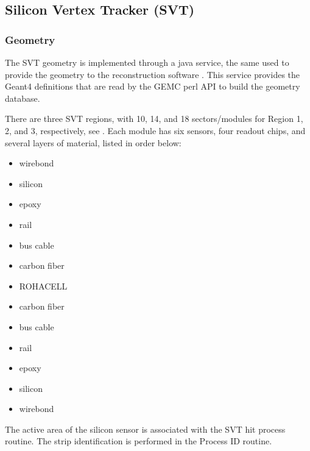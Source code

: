 \subsection{Silicon Vertex Tracker (SVT)}


\subsubsection{Geometry}


The SVT \cite{svt2019} geometry is implemented through a java service, the same used to provide the geometry
to the reconstruction software \cite{reco2019}.
This service provides the Geant4 definitions that are read by the GEMC perl API to build the geometry database.

There are three SVT regions, with 10, 14, and 18 sectors/modules for Region 1, 2, and 3, respectively, see .
Each module has six sensors, four readout chips, and several layers of material, listed in order below:

\begin{itemize}
	\item wirebond
	\item silicon
	\item epoxy
	\item rail
	\item bus cable
	\item carbon fiber
	\item ROHACELL
	\item carbon fiber
	\item bus cable
	\item rail
	\item epoxy
	\item silicon
	\item wirebond
\end{itemize}

The active area of the silicon sensor is associated with the SVT hit process routine.
The strip identification is performed in the Process ID routine.

